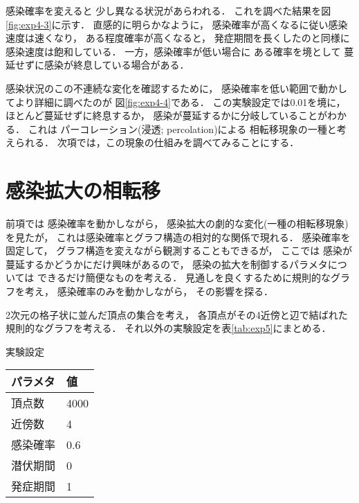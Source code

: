 \documentclass[10pt,oneside]{scrartcl}
\begin{document}
感染確率を変えると
少し異なる状況があらわれる．
これを調べた結果を図\ref{fig:exp4-3}に示す．
直感的に明らかなように，
感染確率が高くなるに従い感染速度は速くなり，
ある程度確率が高くなると，
発症期間を長くしたのと同様に
感染速度は飽和している．
一方，感染確率が低い場合に
ある確率を境として
蔓延せずに感染が終息している場合がある．

\begin{figure*}%
  \centering
\end{figure*}

感染状況のこの不連続な変化を確認するために，
感染確率を低い範囲で動かしてより詳細に調べたのが
図\ref{fig:exp4-4}である．
この実験設定では0.01を境に，
ほとんど蔓延せずに終息するか，
感染が蔓延するかに分岐していることがわかる．
これは
パーコレーション(浸透; percolation)による
相転移現象の一種と考えられる．
次項では，この現象の仕組みを調べてみることにする．

\section{感染拡大の相転移}
\label{sec:orgb43def8}

前項では
感染確率を動かしながら，
感染拡大の劇的な変化(一種の相転移現象)を見たが，
これは感染確率とグラフ構造の相対的な関係で現れる．
感染確率を固定して，
グラフ構造を変えながら観測することもできるが，
ここでは
感染が蔓延するかどうかにだけ興味があるので，
感染の拡大を制御するパラメタについては
できるだけ簡便なものを考える．
見通しを良くするために規則的なグラフを考え，
感染確率のみを動かしながら，
その影響を探る．

2次元の格子状に並んだ頂点の集合を考え，
各頂点がその4近傍と辺で結ばれた規則的なグラフを考える．
それ以外の実験設定を表\ref{tab:exp5}にまとめる．

\begin{margintable}
  \caption{実験設定}
  \label{tab:exp5}
  \small
  \begin{tabular}{ll}
    \toprule
    パラメタ&値 \\
    \midrule
    頂点数&4000 \\
    近傍数&4 \\
    感染確率&0.6 \\
    潜伏期間&0 \\
    発症期間&1 \\
    \bottomrule
  \end{tabular}
\end{margintable}
\end{document}

